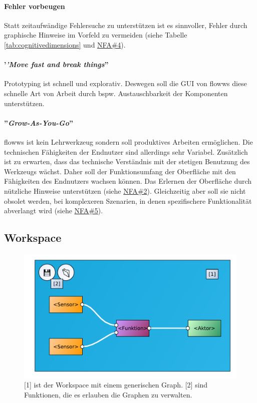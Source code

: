 \paragraph{Fehler vorbeugen}\label{par:fehlervorbeugen} Statt zeitaufwändige Fehlersuche zu unterstützen ist es sinnvoller, Fehler durch graphische Hinweise im Vorfeld zu vermeiden (siehe Tabelle \ref{tab:cognitivedimensions} und  \hyperref[tab:NFA4]{NFA\#4}).

\paragraph{'\textit{'Move fast and break things}''}\label{par:movefast} Prototyping ist schnell und explorativ. Deswegen soll die \ac{GUI} von flowws diese schnelle Art von Arbeit durch bspw. Austauschbarkeit der Komponenten unterstützen.

\paragraph{''\textit{Grow-As-You-Go}''}\label{par:growasyougo} flowws ist kein Lehrwerkzeug sondern soll produktives Arbeiten ermöglichen. Die technischen Fähigkeiten der Endnutzer sind allerdings sehr Variabel. Zusätzlich ist zu erwarten, dass das technische Verständnis mit der stetigen Benutzung des Werkzeugs wächst. Daher soll der Funktionsumfang der Oberfläche mit den Fähigkeiten des Endnutzers wachsen können. Das Erlernen der Oberfläche durch nützliche Hinweise unterstützen (siehe \hyperref[tab:NFA2]{NFA\#2}). Gleichzeitig aber soll sie nicht obsolet werden, bei komplexeren Szenarien, in denen spezifischere Funktionalität abverlangt wird (siehe  \hyperref[tab:NFA5]{NFA\#5}).


\subsection{Workspace}
\begin{figure}[h]
  \centering
  \includegraphics[width=.75\textwidth]{bilder/chapter4/chapter4_3/workspace.pdf}
  \caption{[1] ist der Workspace mit einem generischen Graph. [2] sind Funktionen, die es erlauben die Graphen zu verwalten.}
  \label{fig:workspace}
\end{figure}


